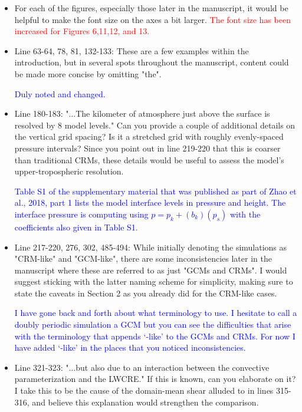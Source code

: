 \documentclass[draft]{agujournal2019}
\begin{document}
\begin{itemize}
  \item For each of the figures, especially those later in the manuscript, it would be helpful to make the font size on the axes a bit larger.
  \textcolor{red}{The font size has been increased for Figures 6,11,12, and 13.}
  
  \item Line 63-64, 78, 81, 132-133: These are a few examples within the introduction, but in several spots throughout the manuscript, content could be made more concise by omitting "the".  
  
  \textcolor{blue}{Duly noted and changed.}
  
  \item Line 180-183: "...The kilometer of atmosphere just above the surface is resolved by 8 model levels." Can you provide a couple of additional details on the vertical grid spacing? Is it a stretched grid with roughly evenly-spaced pressure intervals? Since you point out in line 219-220 that this is coarser than traditional CRMs, these details would be useful to assess the model's upper-tropospheric resolution.  
  
  \textcolor{blue}{Table S1 of the supplementary material that was published as part of Zhao et al., 2018, part 1 lists the model interface levels in pressure and height.  The interface pressure is computing using $p=p_k+(b_k)(p_s)$ with the coefficients also given in Table S1.}
  
  \item Line 217-220, 276, 302, 485-494: While initially denoting the simulations as "CRM-like" and "GCM-like", there are some inconsistencies later in the manuscript where these are referred to as just "GCMs and CRMs". I would suggest sticking with the latter naming scheme for simplicity, making sure to state the caveats in Section 2 as you already did for the CRM-like cases.  
  
  \textcolor{blue}{I have gone back and forth about what terminology to use.  I hesitate to call a doubly periodic simulation a GCM but you can see the difficulties that arise with the terminology that appends ‘-like’ to the GCMs and CRMs.  For now I have added ‘-like’ in the places that you noticed inconsistencies. }
  
  \item Line 321-323: "...but also due to an interaction between the convective parameterization and the LWCRE." If this is known, can you elaborate on it? I take this to be the cause of the domain-mean shear alluded to in lines 315-316, and believe this explanation would strengthen the comparison.
  

\end{itemize}
\end{document}
